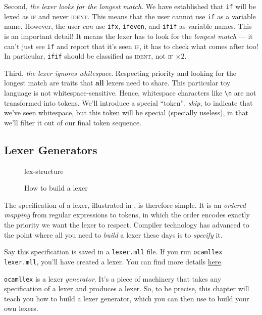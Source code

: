 Second, \emph{the lexer looks for the longest match}. We have established that \texttt{if} will be lexed as \textsc{if} and never \textsc{ident}. This means that the user cannot use \texttt{if} as a variable name. However, the user \emph{can} use \texttt{ifx}, \texttt{ifeven}, and \texttt{ifif} as variable names. This is an important detail! It means the lexer has to look for the \emph{longest match} --- it can't just see \texttt{if} and report that it's seen \textsc{if}, it has to check what comes after too! In particular, \texttt{ifif} should be classified as \textsc{ident}, not \textsc{if} $\times 2$.

Third, \emph{the lexer ignores whitespace}. Respecting priority and looking for the longest match are traits that \textbf{all} lexers need to share. This particular toy language is not whitespace-sensitive. Hence, whitespace characters like \verb|\n| are not transformed into tokens. We'll introduce a special ``token'', \emph{skip}, to indicate that we've seen whitespace, but this token will be special (specially useless), in that we'll filter it out of our final token sequence. 

\subsection{Lexer Generators}
\begin{figure}[H]
    \begin{center}
        {lex-structure}
    \end{center}
    \caption{How to build a lexer}
    \label{fig:build-lexer}
\end{figure}

The specification of a lexer, illustrated in , is therefore simple. It is an \emph{ordered mapping} from regular expressions to tokens, in which the order encodes exactly the priority we want the lexer to respect. Compiler technology has advanced to the point where all you need to \textit{build} a lexer these days is to \textit{specify} it.

Say this specification is saved in a \texttt{lexer.mll} file. If you run \texttt{ocamllex lexer.mll}, you'll have created a lexer. You can find more details \href{https://ocaml.org/manual/5.2/lexyacc.html}{here}.

\texttt{ocamllex} is a lexer \emph{generator}. It's a piece of machinery that takes any specification of a lexer and produces a lexer. So, to be precise, this chapter will teach you how to build a lexer generator, which you can then use to build your own lexers. 

